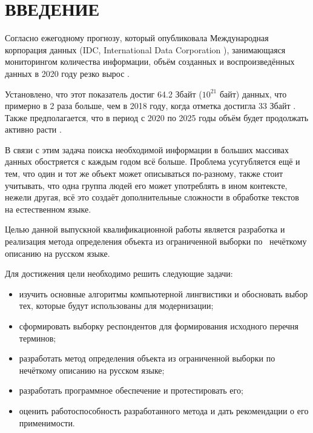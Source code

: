 \section*{ВВЕДЕНИЕ}

Согласно ежегодному прогнозу, который опубликовала Международная корпорация данных (IDC, International Data Corporation \cite{IDC}), занимающаяся мониторингом количества информации, объём созданных и воспроизведённых \, данных в 2020 году резко вырос \cite{IDC2020}.

Установлено, что этот показатель достиг 64.2 Збайт ($10^{21}$ байт) данных, что примерно в 2 раза больше, чем в 2018 году, когда отметка достигла 33 Збайт \cite{IDC2020,IDC2018}. Также предполагается, что в период с 2020 по 2025 годы объём будет продолжать активно расти \cite{IDC2025}.

В связи с этим задача поиска необходимой информации в больших массивах данных обостряется с каждым годом всё больше. Проблема усугубляется ещё и тем, что один и тот же объект может описываться по-разному, также стоит учитывать, что одна группа людей его может употреблять в ином контексте, нежели другая, всё это создаёт дополнительные сложности в обработке текстов на естественном языке. 

Целью данной выпускной квалификационной работы является разработка и реализация метода определения объекта из ограниченной выборки по \, нечёткому описанию на русском языке.

Для достижения цели необходимо решить следующие задачи:
\begin{itemize}	
	\item изучить основные алгоритмы компьютерной лингвистики и обосновать выбор тех, которые будут использованы для модернизации;
	
	\item сформировать выборку респондентов для формирования исходного перечня терминов;
	
	\item разработать метод определения объекта из ограниченной выборки по \, нечёткому описанию на русском языке;
	
	\item разработать программное обеспечение и протестировать его;
	
	\item оценить работоспособность разработанного метода и дать рекомендации о его применимости.
\end{itemize}


\pagebreak




















